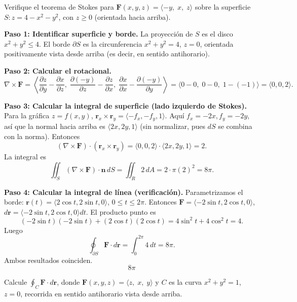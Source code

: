 \begin{example}
Verifique el teorema de Stokes para $\mathbf{F}(x,y,z)=\langle -y,\; x,\; z\rangle$ sobre la superficie $S: z=4-x^2-y^2$, con $z\ge 0$ (orientada hacia arriba).
\end{example}

\begin{myproof}
\textbf{Paso 1: Identificar superficie y borde.}
La proyección de $S$ es el disco $x^2+y^2\le 4$. El borde $\partial S$ es la circunferencia $x^2+y^2=4$, $z=0$, orientada positivamente vista desde arriba (es decir, en sentido antihorario).

\textbf{Paso 2: Calcular el rotacional.}
\[
\nabla\times\mathbf{F}
=
\left\langle
\frac{\partial z}{\partial y}-\frac{\partial x}{\partial z},\;
\frac{\partial (-y)}{\partial z}-\frac{\partial z}{\partial x},\;
\frac{\partial x}{\partial x}-\frac{\partial (-y)}{\partial y}
\right\rangle
=
\langle 0-0,\;0-0,\;1-(-1)\rangle
=
\langle 0,0,2\rangle.
\]

\textbf{Paso 3: Calcular la integral de superficie (lado izquierdo de Stokes).}
Para la gráfica $z=f(x,y)$, $\mathbf{r}_x\times\mathbf{r}_y=\langle -f_x,-f_y,1\rangle$. Aquí $f_x=-2x, f_y=-2y$, así que la normal hacia arriba es $\langle 2x,2y,1\rangle$ (sin normalizar, pues $dS$ se combina con la norma). Entonces
\[
(\nabla\times\mathbf{F})\cdot(\mathbf{r}_x\times\mathbf{r}_y)
= \langle 0,0,2\rangle\cdot\langle 2x,2y,1\rangle = 2.
\]
La integral es
\[
\iint_S (\nabla\times\mathbf{F})\cdot\mathbf{n}\,dS
= \iint_R 2\,dA = 2\cdot \pi(2)^2 = 8\pi.
\]

\textbf{Paso 4: Calcular la integral de línea (verificación).}
Parametrizamos el borde: $\mathbf{r}(t)=\langle 2\cos t, 2\sin t, 0\rangle$, $0\le t\le 2\pi$. Entonces $\mathbf{F}=\langle -2\sin t, 2\cos t, 0\rangle$, $d\mathbf{r}=\langle -2\sin t, 2\cos t, 0\rangle dt$. El producto punto es
\[
(-2\sin t)(-2\sin t) + (2\cos t)(2\cos t) = 4\sin^2 t + 4\cos^2 t = 4.
\]
Luego
\[
\oint_{\partial S}\mathbf{F}\cdot d\mathbf{r} = \int_0^{2\pi} 4\,dt = 8\pi.
\]
Ambos resultados coinciden.
\[
\boxed{8\pi}
\]
\end{myproof}

\begin{example}
Calcule $\displaystyle \oint_C \mathbf{F}\cdot d\mathbf{r}$, donde $\mathbf{F}(x,y,z)=\langle z,\; x,\; y\rangle$ y $C$ es la curva $x^2+y^2=1$, $z=0$, recorrida en sentido antihorario vista desde arriba.
\end{example}

